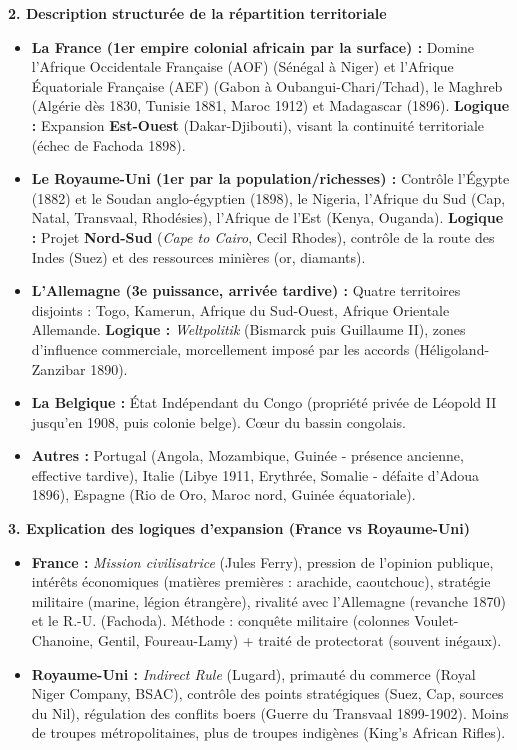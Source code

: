 \documentclass[11pt]{article}
\newcommand{\cle}[1]{{\popxbold\color{popdark}#1}}
\begin{document}
\begin{exoresolu}
\textbf{2. Description structurée de la répartition territoriale}
\begin{itemize}
    \item \textbf{La France (1er empire colonial africain par la surface) :} Domine l'\cle{Afrique Occidentale Française (AOF)} (Sénégal à Niger) et l'\cle{Afrique Équatoriale Française (AEF)} (Gabon à Oubangui-Chari/Tchad), le \cle{Maghreb} (Algérie dès 1830, Tunisie 1881, Maroc 1912) et \cle{Madagascar} (1896). \textbf{Logique :} Expansion \textbf{Est-Ouest} (Dakar-Djibouti), visant la continuité territoriale (échec de Fachoda 1898).
    \item \textbf{Le Royaume-Uni (1er par la population/richesses) :} Contrôle l'\cle{Égypte} (1882) et le \cle{Soudan anglo-égyptien} (1898), le \cle{Nigeria}, l'\cle{Afrique du Sud} (Cap, Natal, Transvaal, Rhodésies), l'\cle{Afrique de l'Est} (Kenya, Ouganda). \textbf{Logique :} Projet \textbf{Nord-Sud} (\emph{Cape to Cairo}, Cecil Rhodes), contrôle de la route des Indes (Suez) et des ressources minières (or, diamants).
    \item \textbf{L'Allemagne (3e puissance, arrivée tardive) :} Quatre territoires disjoints : \cle{Togo}, \cle{Kamerun}, \cle{Afrique du Sud-Ouest}, \cle{Afrique Orientale Allemande}. \textbf{Logique :} \emph{Weltpolitik} (Bismarck puis Guillaume II), zones d'influence commerciale, morcellement imposé par les accords (Héligoland-Zanzibar 1890).
    \item \textbf{La Belgique :} \cle{État Indépendant du Congo} (propriété privée de Léopold II jusqu'en 1908, puis colonie belge). Cœur du bassin congolais.
    \item \textbf{Autres :} Portugal (Angola, Mozambique, Guinée - présence ancienne, effective tardive), Italie (Libye 1911, Erythrée, Somalie - défaite d'Adoua 1896), Espagne (Rio de Oro, Maroc nord, Guinée équatoriale).
\end{itemize}

\textbf{3. Explication des logiques d'expansion (France vs Royaume-Uni)}
\begin{itemize}
    \item \textbf{France :} \emph{Mission civilisatrice} (Jules Ferry), pression de l'opinion publique, intérêts économiques (matières premières : arachide, caoutchouc), stratégie militaire (marine, légion étrangère), rivalité avec l'Allemagne (revanche 1870) et le R.-U. (Fachoda). Méthode : \cle{conquête militaire} (colonnes Voulet-Chanoine, Gentil, Foureau-Lamy) + \cle{traité de protectorat} (souvent inégaux).
    \item \textbf{Royaume-Uni :} \emph{Indirect Rule} (Lugard), primauté du commerce (Royal Niger Company, BSAC), contrôle des points stratégiques (Suez, Cap, sources du Nil), régulation des conflits boers (Guerre du Transvaal 1899-1902). Moins de troupes métropolitaines, plus de troupes indigènes (King's African Rifles).
\end{itemize}


\end{exoresolu}
\end{document}
